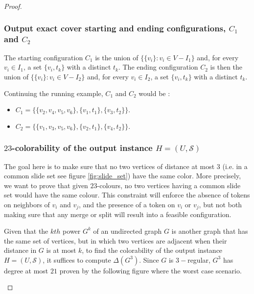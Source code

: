 \begin{proof}
\subsubsection{Output exact cover starting and ending configurations, $C_1$ and $C_2$}
The starting configuration $C_1$ is the union of $\{\{ v_i \} : v_i \in V - I_1\}$ and, for every $v_i \in I_1$, a set $\{v_i, t_k\}$ with a
distinct $t_k$.
The ending configuration $C_2$ is then the union of $\{\{ v_i \} : v_i \in V - I_2\}$ and, for every $v_i \in I_2$, a set $\{v_i, t_k\}$ with a
distinct $t_k$.

\begin{example}Continuing the running example, $C_1$ and $C_2$ would be :
\begin{itemize}
  \item $C_1 = \{ \{v_2, v_4, v_5, v_6\}, \{v_1, t_1\}, \{v_3, t_2\}\}$.
  \item $C_2 = \{ \{v_1, v_3, v_5, v_6\}, \{v_2, t_1\}, \{v_4, t_2\}\}$.
\end{itemize}
\end{example}

\subsubsection{$23$-colorability of the output instance $H = (U, \mathcal{S})$}\label{subsubsection:23_colorability}
The goal here is to make sure that no two vertices of distance at most $3$ (i.e. in a common slide set see figure \ref{fig:slide_set}) have the same
color. More precisely, we want to prove that given $23$-colours, no two vertices having a common slide set would have the same colour.
This constraint will enforce the absence of tokens on neighbors of $v_i$ and $v_j$, and the presence of a token on $v_i$ or $v_j$, but not both
making sure that any merge or split will result into a feasible configuration.

Given that the $kth$ power $G^{k}$ of an undirected graph $G$ is another graph that has the same set of vertices, but in which two vertices are
adjacent when their distance in $G$ is at most $k$, to find the colorability of the output instance $H = (U, \mathcal{S})$, it suffices to
compute $\Delta(G^{3})$. Since $G$ is $3-$regular, $G^3$ has degree at most $21$ proven by the following figure where the worst case
scenario.

\begin{figure} [H]
  \centering
\end{figure}
\end{proof}
